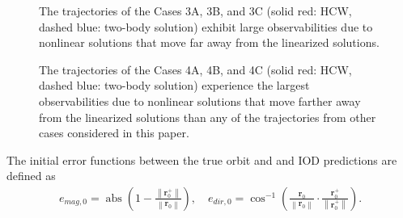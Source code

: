 \documentclass[letterpaper, paper,10pt]{AAS}		%
\newcommand{\abs}{\mathop{\mathrm{abs}}\nolimits}
\newcommand{\norm}[1]{\ensuremath{\left\| #1 \right\|}}
\renewcommand{\r}{\mathbf{r}}
\begin{document}
\begin{figure}[h]
\centerline{
	\hfill
	\hfill
}
\caption{The trajectories of the Cases 3A, 3B, and 3C (solid red: HCW, dashed blue: two-body solution) exhibit large observabilities due to nonlinear solutions that move far away from the linearized solutions.}
\label{fig:3CasesTraj}
\end{figure}

\begin{figure}[h]
\centerline{
	\hfill
	\hfill
}
\caption{The trajectories of the Cases 4A, 4B, and 4C (solid red: HCW, dashed blue: two-body solution) experience the largest observabilities due to nonlinear solutions that move farther away from the linearized solutions than any of the trajectories from other cases considered in this paper.}
\label{fig:4CasesTraj}
\end{figure}



The initial error functions between the true orbit and and IOD predictions are defined as
\begin{align}
e_{mag,0}=\abs\left(1-{\frac{\norm{\r^+_0}}{\norm{\r_0}}}\right), \quad e_{dir,0}=\cos^{-1}\left(\frac{\r_0}{\norm{\r_0}}\cdot \frac{\r^+_0}{\norm{\r^+_0}}\right).
\end{align}
\end{document}
